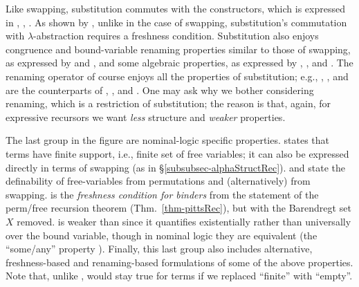 Like swapping, substitution %
commutes with the 
constructors, which is expressed in \SbVr{}, \SbAp{}, \SbLm{}. 
As shown by \SbLm{}, unlike in the case of 
swapping, substitution's commutation with 
$\lambda$-abstraction requires  a freshness condition. 
%
Substitution also enjoys congruence and bound-variable renaming properties similar to those of swapping,  as  
expressed by \SbCg{} and \SbBvr{}, and some algebraic properties, as expressed by \SbId{}, \SbIm{}, \SbCh{} 
and \SbCm{}.  The renaming 
operator of course enjoys all the properties of substitution; e.g., \RnVr{}, \RnAp{}, \RnLmO{} and \RnCg{} are the counterparts of \SbVr{}, \SbAp{}, \SbLm{} and \SbCg{}. 
One may ask why we bother considering renaming, which is a restriction of substitution;  
the reason is that, again, for expressive recursors we want \emph{less} structure and \emph{weaker} properties.  

The last group in the figure %
are nominal-logic specific properties.  
\FSupFv{} states that terms have finite support, i.e., finite set of free variables; it can %
also be expressed directly 
in terms of swapping (as in \S\ref{subsubsec-alphaStructRec}).  
\FvDPm{} and \FvDSw{} state the definability of free-variables from permutations and (alternatively) from swapping.  
%
%
%
%
%
%
\FCB{} is the \emph{freshness condition for binders} 
from  the statement of the perm/free recursion theorem (Thm.~\ref{thm-pittsRec}), but with the Barendregt set $X$ removed.  
\FCB{} is weaker than \FvLm{} since it quantifies existentially rather than universally over the bound variable, though in nominal logic they are equivalent (the ``some/any'' property \cite{pitts-AlphaStructural}).   
%
Finally, this last group also includes alternative, freshness-based and renaming-based formulations of 
some of the above properties. Note that, unlike \FrDSw{}, \FrDRn{} would stay true for terms if we replaced ``finite'' with ``empty''. 

